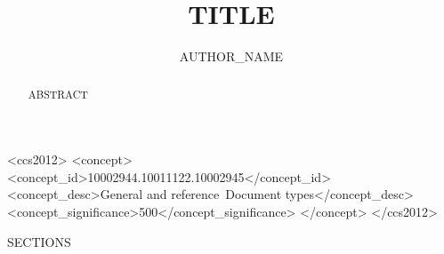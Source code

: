 \documentclass[sigconf]{acmart}
\begin{document}
\title{{{TITLE}}}

\author{{{AUTHOR_NAME}}}

\begin{abstract}
{{ABSTRACT}}
\end{abstract}

\begin{CCSXML}
<ccs2012>
   <concept>
       <concept_id>10002944.10011122.10002945</concept_id>
       <concept_desc>General and reference~Document types</concept_desc>
       <concept_significance>500</concept_significance>
   </concept>
</ccs2012>
\end{CCSXML}



\maketitle

{{SECTIONS}}



\end{document}
